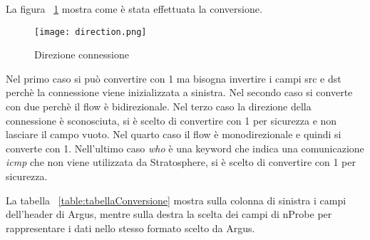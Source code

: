 \documentclass[../main.tex]{subfiles}
\begin{document}
La figura ~\ref{fig:direction} mostra come è stata effettuata la conversione.
\begin{figure}[H]
				\centering
\texttt{[image: direction.png]}
				\caption{Direzione connessione}
				\label{fig:direction}
\end{figure}
Nel primo caso si può convertire con 1 ma bisogna invertire i campi src e dst perchè la connessione viene inizializzata a sinistra. Nel secondo caso si converte con due perchè il flow è bidirezionale. Nel terzo caso la direzione della connessione è sconosciuta, si è scelto di convertire con 1 per sicurezza e non lasciare il campo vuoto. Nel quarto caso il flow è monodirezionale e quindi si converte con 1. Nell'ultimo caso \textit{who} è una keyword che indica una comunicazione \textit{icmp} che non viene utilizzata da Stratosphere, si è scelto di convertire con 1 per sicurezza.

La tabella ~\ref{table:tabellaConversione} mostra sulla colonna di sinistra i campi dell'header di Argus, mentre sulla destra la scelta dei campi di nProbe per rappresentare i dati nello stesso formato scelto da Argus.
\end{document}
